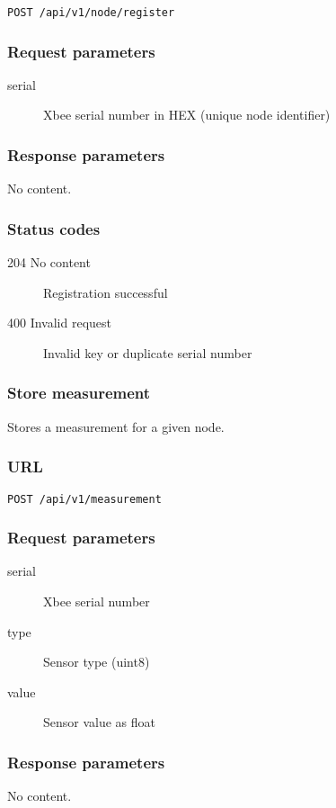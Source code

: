 \documentclass[a4paper,11pt]{scrartcl}
\begin{document}
\texttt{POST /api/v1/node/register}

\subsubsection*{Request parameters}
\begin{description}
\item[serial] Xbee serial number in HEX (unique node identifier)
\end{description}

\subsubsection*{Response parameters}
No content.

\subsubsection*{Status codes}
\begin{description}
\item[204 No content] Registration successful
\item[400 Invalid request] Invalid key or duplicate serial number
\end{description}

\subsubsection{Store measurement}
Stores a measurement for a given node.

\subsubsection*{URL}
\texttt{POST /api/v1/measurement}

\subsubsection*{Request parameters}
\begin{description}
\item[serial] Xbee serial number
\item[type] Sensor type (uint8)
\item[value] Sensor value as float
\end{description}

\subsubsection*{Response parameters}
No content.
\end{document}
